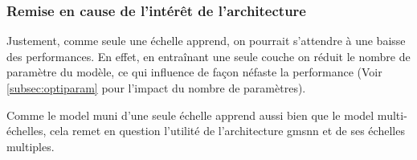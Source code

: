 \subsubsection{Remise en cause de l'intérêt de l'architecture}
Justement, comme seule une échelle apprend, on pourrait s'attendre à une baisse des performances. En effet, en entraînant une seule couche on réduit le nombre de paramètre du modèle, ce qui influence de façon néfaste la performance (Voir \autoref{subsec:optiparam} pour l'impact du nombre de paramètres).

Comme le \gls{model} muni d'une seule échelle apprend aussi bien que le \gls{model} multi-échelles, cela remet en question l'utilité de l'architecture \gls{gmsnn} et de ses échelles multiples.
